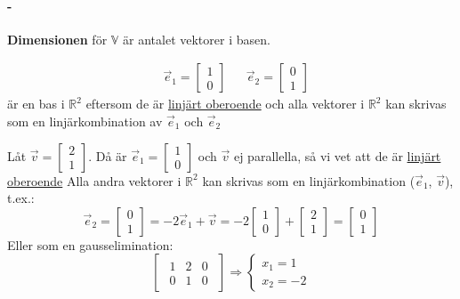 \paragraph{-} %
\label{par:dimension_}
\textbf{Dimensionen} för $\mathbb{V}$ är antalet vektorer i basen.
\begin{Ex}
	\begin{align*}
	&\vec{e}_1 = \begin{bmatrix} 1\\0 \end{bmatrix}
	&&\vec{e}_2 = \begin{bmatrix} 0\\1 \end{bmatrix}
	\end{align*}
	är en bas i $\mathbb{R}^2$ eftersom de är \underline{linjärt oberoende} och alla vektorer i $\mathbb{R}^2$ kan skrivas som en linjärkombination av $\vec{e}_1$ och $\vec{e}_2$
\end{Ex}
\begin{Ex}
	Låt $\vec{v} = \begin{bmatrix} 2\\1 \end{bmatrix}$. Då är $\vec{e}_1 = \begin{bmatrix} 1\\0 \end{bmatrix}$ och $\vec{v}$ ej parallella, så vi vet att de är \underline{linjärt oberoende}
	Alla andra vektorer i $\mathbb{R}^2$ kan skrivas som en linjärkombination ($\vec{e}_1$, $\vec{v}$), t.ex.:
	\[
	\vec{e}_2 = \begin{bmatrix} 0\\1 \end{bmatrix} = -2 \vec{e}_1 + \vec{v} = -2 \begin{bmatrix} 1\\0 \end{bmatrix} + \begin{bmatrix} 2\\1 \end{bmatrix} = \begin{bmatrix} 0\\1 \end{bmatrix}
	\]
	Eller som en gausselimination:
	\[
	\begin{bmatrix}
		\begin{array}{cc|c}
			1 & 2 & 0\\
			0 & 1 & 0
		\end{array}
	\end{bmatrix}
	\Rightarrow
	\begin{cases}
		x_1 = 1\\
		x_2 = -2
	\end{cases}
	\]
\end{Ex}
